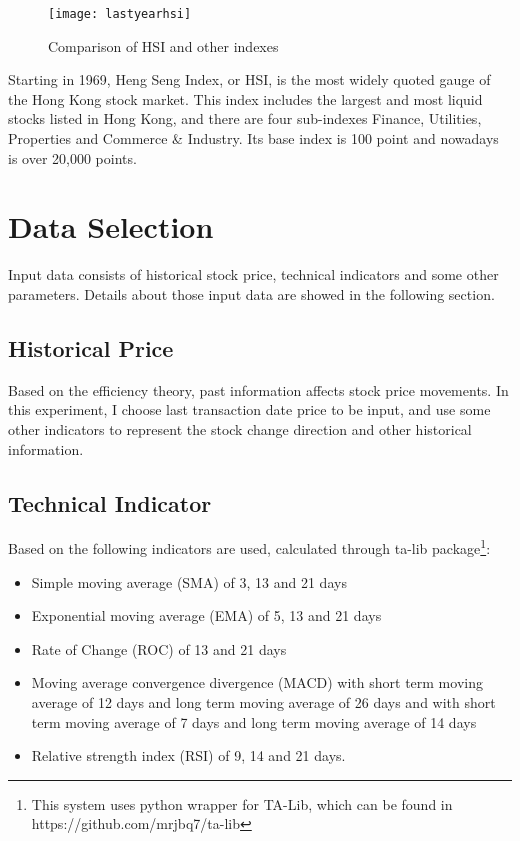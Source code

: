 \begin{figure}[ht]
	\centering
	\texttt{[image: lastyearhsi]}
	\caption{Comparison of HSI and other indexes}
\end{figure}

Starting in 1969, Heng Seng Index, or HSI, is the most widely quoted gauge of the Hong Kong stock market\cite{hsi_company_profile}. This index includes the largest and most liquid stocks listed in Hong Kong, and there are four sub-indexes Finance, Utilities, Properties and Commerce \& Industry\cite{heng_seng_index}. Its base index is 100 point and nowadays is over 20,000 points.

\section{Data Selection}

Input data consists of historical stock price, technical indicators and some other parameters. Details about those input data are showed in the following section.

\subsection{Historical Price}
Based on the efficiency theory, past information affects stock price movements. In this experiment, I choose last transaction date price to be input, and use some other indicators to represent the stock change direction and other historical information.

\subsection{Technical Indicator}

Based on \cite{lauretto2013evaluation} the following indicators are used, calculated through ta-lib package\footnote{This system uses python wrapper for TA-Lib, which can be found in https://github.com/mrjbq7/ta-lib}:
\begin{itemize}
	\item Simple moving average (SMA) of 3, 13 and 21 days
	\item Exponential moving average (EMA) of 5, 13 and 21 days
	\item Rate of Change (ROC) of 13 and 21 days
	\item Moving average convergence divergence (MACD) with short term moving average of 12 days and long term moving average of 26 days and with short term moving average of 7 days and long term moving average of 14 days
	\item Relative strength index (RSI) of 9, 14 and 21 days.
\end{itemize}

